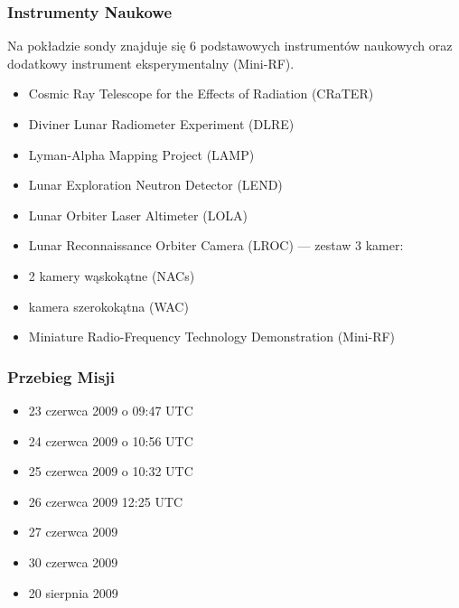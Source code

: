 \documentclass[]{beamer}
\begin{document}
\frame
{
\frametitle{Instrumenty Naukowe}
Na pokładzie sondy znajduje się 6 podstawowych instrumentów naukowych oraz dodatkowy instrument eksperymentalny (Mini-RF).
\begin{itemize}
\item Cosmic Ray Telescope for the Effects of Radiation (CRaTER) 
\item Diviner Lunar Radiometer Experiment (DLRE) 
\item Lyman-Alpha Mapping Project (LAMP) 
\item Lunar Exploration Neutron Detector (LEND)
\item Lunar Orbiter Laser Altimeter (LOLA) 
\item Lunar Reconnaissance Orbiter Camera (LROC) — zestaw 3 kamer:
\item 2 kamery wąskokątne (NACs) 
\item kamera szerokokątna (WAC) 
\item Miniature Radio-Frequency Technology Demonstration (Mini-RF)
\end{itemize}
}
\frame
{
\frametitle{Przebieg Misji}
\begin{itemize}
\item 23 czerwca 2009 o 09:47 UTC
\item 24 czerwca 2009 o 10:56 UTC
\item 25 czerwca 2009 o 10:32 UTC
\item 26 czerwca 2009 12:25 UTC
\item 27 czerwca 2009
\item 30 czerwca 2009
\item 20 sierpnia 2009
\end{itemize}
}
\end{document}
